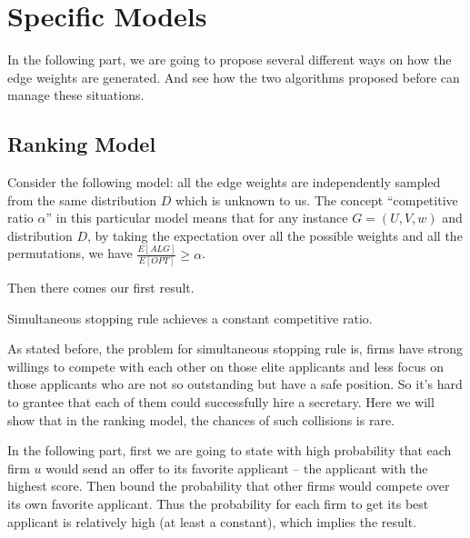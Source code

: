 \chapter{Specific Models}\label{chap:specific}

In the following part, we are going to propose several different ways
on how the edge weights are generated. And see how the two algorithms
proposed before can manage these situations.

\section{Ranking Model}

Consider the following model:
all the edge weights are independently sampled from the same distribution $D$ which is unknown to us.
The concept ``competitive ratio $\alpha$'' in this particular model
means that for any instance $G = (U, V, w)$ and distribution $D$,
by taking the expectation over all the possible weights and
all the permutations, we have $\frac{E[ALG]}{E[OPT]} \ge \alpha$.

Then there comes our first result.

\begin{theorem}\label{rothm}
    Simultaneous stopping rule achieves a constant competitive ratio.
\end{theorem}

As stated before, the problem for simultaneous stopping rule is, firms
have strong willings to compete with each other on those elite applicants
and less focus on those applicants who are not so outstanding but have
a safe position. So it's hard to grantee that each of them could
successfully hire a secretary. Here we will show that in the ranking model,
the chances of such collisions is rare.

In the following part, first we are going to state with high probability
that each firm $u$ would send an offer to its favorite applicant
-- the applicant with the highest score.
Then bound the probability that other firms would compete over its own
favorite applicant. Thus the probability for each firm to get its
best applicant is relatively high (at least a constant), which implies
the result.

